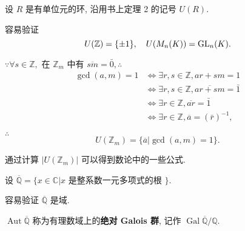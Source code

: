 \documentclass[color=black,device=normal,lang=cn,mode=geye]{elegantnote}
\begin{document}
\begin{example}
    设 $R$ 是有单位元的环, 沿用书上定理 2 的记号 $U(R)$.

    容易验证
    \[U(\mathbb{Z})=\{\pm1\},\quad U(M_n(K))=\operatorname{GL} _n(K).\]

    $\because\forall s\in\mathbb{Z},$ 在 $\mathbb{Z}_m$ 中有 $\overline{sm}=\bar{0},\therefore$
    \begin{align*}
        \gcd(a,m)=1 & \Leftrightarrow\exists r,s\in\mathbb{Z},ar+sm=1 \\
        & \Leftrightarrow\exists r,s\in\mathbb{Z},\overline{ar+sm}=\bar{1} \\
        & \Leftrightarrow\exists r\in\mathbb{Z},\overline{ar}=\bar{1} \\
        & \Leftrightarrow\exists r\in\mathbb{Z},\overline{a}=(\bar{r})^{-1},
    \end{align*}

    $\therefore$
    \[U(\mathbb{Z}_m)=\{\overline{a}|\gcd(a,m)=1\}.\]

    通过计算 $|U(\mathbb{Z}_m)|$ 可以得到数论中的一些公式.
\end{example}
\begin{example}
    设 $\overline{\mathbb{Q}}=\{x\in\mathbb{C}|x$ 是整系数一元多项式的根 $\}$.

    容易验证 $\overline{\mathbb{Q}}$ 是域.

    $\operatorname{Aut}\overline{\mathbb{Q}}$ 称为有理数域上的\textbf{绝对 Galois 群}, 记作 $\operatorname{Gal}\overline{\mathbb{Q}}/\mathbb{Q}$.
\end{example}
\end{document}
